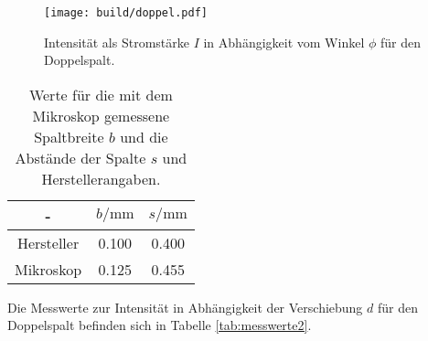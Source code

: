 \begin{figure}
  \centering
  \texttt{[image: build/doppel.pdf]}
  \caption{Intensität als Stromstärke $I$ in Abhängigkeit vom Winkel $\phi$ für den Doppelspalt.}
  \label{fig:doppel}
\end{figure}

  \begin{table}
    \caption{Werte für die mit dem Mikroskop gemessene Spaltbreite $b$ und die Abstände der Spalte $s$ und Herstellerangaben.}
    \centering
    \label{tab:s}
    \begin{tabular}{c c c}
      \toprule
     - & $b/\si{\milli\meter}$ & $s/\si{\milli\meter}$\\
     \midrule
     Hersteller & 0.100 & 0.400 \\
     Mikroskop & 0.125 & 0.455 \\
     \bottomrule
     \end{tabular}
  \end{table}

  Die Messwerte zur Intensität in Abhängigkeit der Verschiebung $d$ für den Doppelspalt befinden sich in Tabelle \ref{tab:messwerte2}.

